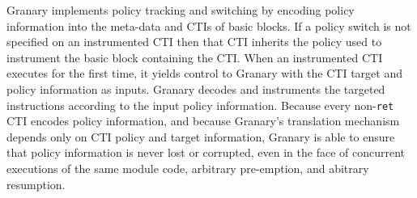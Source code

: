 \documentclass[preprint]{sigplanconf}
\begin{document}


Granary implements policy tracking and switching by encoding policy information into the meta-data and CTIs of basic blocks. If a policy switch is not specified on an instrumented CTI then that CTI inherits the policy used to instrument the basic block containing the CTI. When an instrumented CTI executes for the first time, it yields control to Granary with the CTI target and policy information as inputs. Granary decodes and instruments the targeted instructions according to the input policy information. Because every non-\texttt{ret} CTI encodes policy information, and because Granary's translation mechanism depends only on CTI policy and target information, Granary is able to ensure that policy information is never lost or corrupted, even in the face of concurrent executions of the same module code, arbitrary pre-emption, and abitrary resumption.

\end{document}
